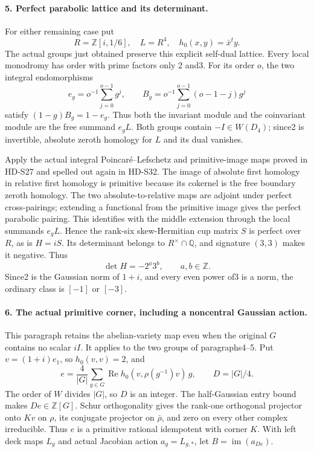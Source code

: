 \paragraph{5. Perfect parabolic lattice and its determinant.}
For either remaining case put
\[
          R=\mathbb Z[i,1/6],\quad L=R^4,
          \quad h_0(x,y)=\bar x^t y.                        \tag{S35.5}
\]
The actual groups just obtained preserve this explicit self-dual
lattice. Every local monodromy has order with prime factors only
2 and3. For its order \(o\), the two integral endomorphisms
\[
 e_g=o^{-1}\sum_{j=0}^{o-1}g^j,
 \qquad B_g=o^{-1}\sum_{j=0}^{o-1}(o-1-j)g^j
\]
satisfy \((1-g)B_g=1-e_g\). Thus both the invariant module and
the coinvariant module are the free summand \(e_gL\).
Both groups contain \(-I\in W(D_4)\); since2 is invertible,
absolute zeroth homology for \(L\) and its dual vanishes.

Apply the actual integral Poincar\'e--Lefschetz and primitive-image
maps proved in HD-S27 and spelled out again in HD-S32. The image
of absolute first homology in relative first homology is primitive
because its cokernel is the free boundary zeroth homology. The two
absolute-to-relative maps are adjoint under perfect cross-pairings;
extending a functional from the primitive image gives the perfect
parabolic pairing. This identifies with the middle extension through
the local summands \(e_gL\). Hence the rank-six skew-Hermitian
cup matrix \(S\) is perfect over \(R\), as is \(H=iS\).
Its determinant belongs to \(R^\times\cap\mathbb Q\), and
signature \((3,3)\) makes it negative. Thus
\[
                   \det H=-2^a3^b,
                   \qquad a,b\in\mathbb Z.
\]
Since2 is the Gaussian norm of \(1+i\), and every even power
of3 is a norm, the ordinary class is \([-1]\) or \([-3]\).

\paragraph{6. The actual primitive corner, including a noncentral Gaussian action.}
This paragraph retains the abelian-variety map even when the original
\(G\) contains no scalar \(iI\). It applies to the two groups of
paragraphs4--5. Put \(v=(1+i)e_1\), so \(h_0(v,v)=2\), and
\[
 e=\frac4{|G|}\sum_{g\in G}
       \operatorname{Re}h_0(v,\rho(g^{-1})v)\,g,
       \qquad D=|G|/4.                                     \tag{S35.6}
\]
The order of \(W\) divides \(|G|\), so \(D\) is an integer.
The half-Gaussian entry bound makes \(De\in\mathbb Z[G]\).
Schur orthogonality gives the rank-one orthogonal projector onto
\(Kv\) on \(\rho\), its conjugate projector on \(\bar\rho\),
and zero on every other complex irreducible. Thus \(e\) is a
primitive rational idempotent with corner \(K\).
With left deck maps \(L_g\) and actual Jacobian action
\(a_g=L_{g,*}\), let \(B=\operatorname{im}(a_{De})\).

